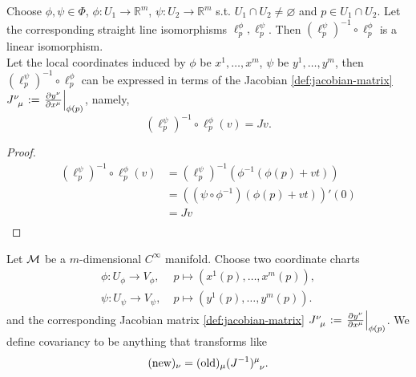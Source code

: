 \documentclass[../main.tex]{subfiles}
\begin{document}
    \begin{theorem}\label{thm:straight-overlap}
        Choose \(\phi, \psi \in \Phi\), \(\phi : U_1 \to \mathbb{R}^m\), 
        \(\psi : U_2 \to \mathbb{R}^m\) s.t. \(U_1 \cap U_2 \neq \varnothing\) and 
        \(p \in U_1 \cap U_2\). Let the corresponding straight line isomorphisms 
        \(\ell_p^\phi, \ell_p^\psi\). Then \((\ell_p^\psi)^{-1} \circ \ell_p^\phi\) 
        is a linear isomorphism. \\
        Let the local coordinates induced by \(\phi\) be \(x^1, \dots, x^m\), 
        \(\psi\) be \(y^1, \dots, y^m\), then 
        \((\ell_p^\psi)^{-1} \circ \ell_p^\phi\) can be expressed in terms of 
        the Jacobian \cref{def:jacobian-matrix} \(J\indices{^\nu_\mu}:=
        \left.\frac{\partial y^\nu}{\partial x^\mu}\right|_{\phi(p)}\), namely, 
        \[
        (\ell_p^\psi)^{-1} \circ \ell_p^\phi(v) = Jv.
        \]
    \end{theorem}
    \begin{proof}
        \[
        \begin{aligned}
            (\ell_p^\psi)^{-1} \circ \ell_p^\phi(v) &= 
            (\ell_p^\psi)^{-1}(\phi ^{-1}(\phi(p)+vt)) \\
            &= ((\psi \circ \phi ^{-1})(\phi(p)+vt))'(0) \\
            & = Jv \\
        \end{aligned}
        \]
    \end{proof}
    \begin{definition}\label{def:contravariant-covariant}
        Let \(\manifold[M]\) be a \(m\)-dimensional \(C^\infty\) manifold. 
        Choose two coordinate charts
        \[
        \begin{aligned}
            \phi : U_\phi \to V_\phi,& \; p \mapsto (x^1(p), \dots, x^m(p)), \\
            \psi : U_\psi \to V_\psi,& \; p \mapsto (y^1(p), \dots, y^m(p)).
        \end{aligned}
        \]
        and the corresponding Jacobian matrix \cref{def:jacobian-matrix} 
        \(J\indices{^\nu_\mu} := \left.\frac{\partial y^\nu}{\partial x^\mu}
        \right|_{\phi(p)}\).
        We define covariancy to be anything that transforms like 
        \[
        (\text{new})_\nu = (\text{old})_\mu(J^{-1})\indices{^\mu_\nu}.
        \]
    \end{definition}
\end{document}
